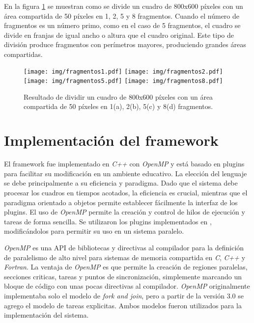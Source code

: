 En la figura \ref{fragmentos} se muestran como se divide un cuadro de 800x600
píxeles con un área compartida de 50 píxeles en 1, 2, 5 y 8 fragmentos. Cuando
el número de fragmentos es un número primo, como en el caso de 5 fragmentos, el
cuadro se divide en franjas de igual ancho o altura que el cuadro original. Este
tipo de división produce fragmentos con perímetros mayores, produciendo grandes
áreas compartidas.

\begin{figure}[!h]

	\texttt{[image: img/fragmentos1.pdf]}
	\texttt{[image: img/fragmentos2.pdf]}
	\texttt{[image: img/fragmentos5.pdf]}
	\texttt{[image: img/fragmentos8.pdf]}
	\caption{Resultado de dividir un cuadro de 800x600 píxeles con un área
	compartida de 50 píxeles en 1(a), 2(b), 5(c) y 8(d) fragmentos.}
	\label{fragmentos}

\end{figure}

\section{Implementación del framework}

El framework fue implementado en \emph{C++} con \emph{OpenMP} y está basado en
plugins para facilitar su modificación en un ambiente educativo.  La elección
del lenguaje se debe principalmente a su eficiencia y paradigma.  Dado que el
sistema debe procesar los cuadros en tiempos acotados, la eficiencia es crucial,
mientras que el paradigma orientado a objetos permite establecer fácilmente la
interfaz de los plugins. El uso de \emph{OpenMP} permite la creación y control
de hilos de ejecución y tareas de forma sencilla. Se utilizaron los plugins
implementados en \cite{torres2014}, modificándolos para permitir su uso en un
sistema paralelo.

\emph{OpenMP} es una API de bibliotecas y directivas al compilador para la
definición de paralelismo de alto nivel para sistemas de memoria compartida en
\emph{C}, \emph{C++} y \emph{Fortran}\cite{ompWeb}. La ventaja de \emph{OpenMP}
es que permite la creación de regiones paralelas, secciones criticas, tareas y
puntos de sincronización, simplemente marcando un bloque de código con unas
pocas directivas al compilador. \emph{OpenMP} originalmente implementaba solo el
modelo de \emph{fork and join}, pero a partir de la versión $3.0$ se agrego el
modelo de tareas explicitas\cite{openmp08}. Ambos modelos fueron utilizados para
la implementación del sistema.

